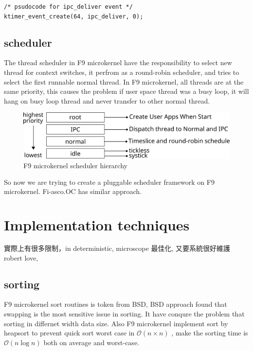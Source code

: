 \documentclass[10pt,preprint,nocopyrightspace]{sigplanconf}
\begin{document}
\begin{lstlisting}[basicstyle=\small,frame=single]
/* psudocode for ipc_deliver event */
ktimer_event_create(64, ipc_deliver, 0);
\end{lstlisting}

\subsection{scheduler}

The thread scheduler in F9 microkernel have the responsibility to select new thread for context switches, it perfrom as a round-robin scheduler, and tries to select the first runnable normal thread. In F9 microkernel, all threads are at the same priority, this causes the problem if user space thread was a busy loop, it will hang on busy loop thread and never transfer to other normal thread.

\begin{figure}[H]
	\begin{center}
		\includegraphics[width=\linewidth]{picture/scheduler.png}
	\end{center}
	\caption{F9 microkernel scheduler hierarchy}
\end{figure}

So now we are trying to create a pluggable scheduler framework on F9 microkernel.  Fi-asco.OC has similar approach\cite{elphinstone2013l3,fiasco}.

\section{Implementation techniques}

實際上有很多限制，in deterministic, microscope 最佳化, 又要系統很好維護
robert love, 

\subsection{sorting}
F9 microkernel sort routines is token from BSD\cite{bentley1993engineering}, BSD approach found that swapping is the most sensitive issue in sorting. It have conqure the problem that sorting in differnet width data size. Also F9 microkernel implement sort by heapsort to prevent quick sort worst case in $\mathcal{O}(n \times n)$ , make the sorting time is $\mathcal{O}(n\log{}n)$  both on average and worst-case.
\end{document}
